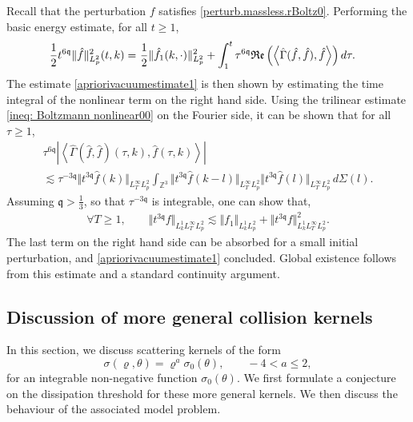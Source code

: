\documentclass[reqno]{amsart}
\newcommand{\pv}{p}
\def\norm#1{\big\Vert#1\big\Vert}
\newcommand{\irnp}[2]{\left\langle {#1},{#2} \right\rangle}
\newcommand{\qq}{\mathfrak{q}}
\newcommand{\tQQq}{t^{6\qq}}
\newcommand{\mrel}{\varrho}
\newcommand{\Z}{\mathbb{Z}}
\newcommand{\real}[1]{\mathfrak{Re}\left(#1\right)}
\theoremstyle{definition}
\numberwithin{equation}{section}
\numberwithin{theorem}{section}
\begin{document}
Recall that the perturbation \(f\) satisfies \eqref{perturb.massless.rBoltz0}. Performing the basic energy estimate, for all \(t\geq 1\),
\begin{align}\notag 
\frac{1}{2} \tQQq \Vert \hat{f}\Vert_{L^2_{\pv}}^2(t,k)=&~\frac{1}{2}\Vert \hat{f}_1(k,\cdot)\Vert_{L^2_{\pv}}^2+\int^t_1 \tau^{6\qq}\real{\irnp{\hat{\Gamma}(\hat{f},\hat{f})}{\hat{f}}}
d\tau.
\end{align}
The estimate \eqref{apriorivacuumestimate1} is then shown by estimating the time integral of the nonlinear term on the right hand side. Using the trilinear estimate \eqref{ineq: Boltzmann nonlinear00} on the Fourier side, it can be shown that for all \(\tau\geq 1\),
\begin{multline*}
   \tau^{6\qq}\left| \irnp{\hat{\Gamma}(\hat{f},\hat{f})(\tau,k)}{\hat{f}(\tau,k)}\right|
   \\
   \lesssim 
   \tau^{-3\qq}{\norm{t^{3\qq} \hat{f}(k)}_{L^\infty_TL^2_{\pv}}}
\int_{\Z^3}  {\norm{t^{3\qq} \hat{f}(k-l)}_{L^\infty_TL^2_{\pv}}}{\norm{t^{3\qq} \hat{f}(l)}_{L^\infty_TL^2_{\pv}}} \,d\Sigma(l). 
\end{multline*}
Assuming \(\qq>\frac{1}{3}\), so that $\tau^{-3\qq}$ is integrable, one can show that,
\begin{align*}
\forall T\geq 1,\qquad {\norm{t^{3\qq} f}_{L^1_kL^\infty_TL^2_{\pv}}}
\lesssim   \norm{f_1}_{L^1_kL^2_{\pv}}
+
{\norm{t^{3\qq} {f}}^{2}_{L^1_k L^\infty_TL^2_{\pv}}}
.  
\end{align*}
The last term on the right hand side can be absorbed for a small initial perturbation, and \eqref{apriorivacuumestimate1} concluded. Global existence follows from this estimate and a standard continuity argument. 




\subsection{Discussion of more general collision kernels}\label{generalkernels}

In this section, we discuss scattering kernels of the form 
\begin{equation}\label{kernelgeneral2}
    \sigma (\mrel,\theta ) = \mrel^a \sigma_0(\theta), \quad  \quad -4<a\leq 2,
\end{equation}
for an integrable non-negative function \(\sigma_0(\theta)\). We first formulate a conjecture on the dissipation threshold for these more general kernels. We then discuss the behaviour of the associated model problem. 
\end{document}
